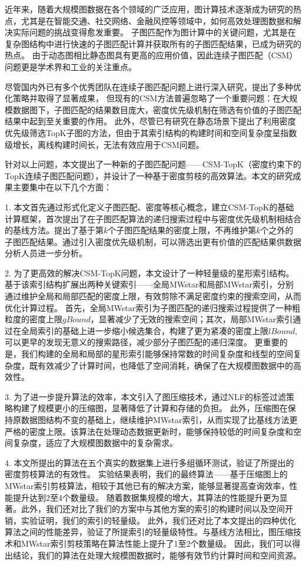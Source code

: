 \begin{summary}
	近年来，随着大规模图数据在各个领域的广泛应用，图计算技术逐渐成为研究的热点，尤其是在智能交通、社交网络、金融风控等领域中，如何高效处理图数据和解决实际问题的挑战变得愈发重要。
	子图匹配作为图计算中的关键问题，尤其是在复杂图结构中进行快速的子图匹配计算并获取所有的子图匹配结果，已成为研究的热点。
	由于动态图相比静态图具有更高的应用价值，因此连续子图匹配（CSM）问题更是学术界和工业的关注重点。

	尽管国内外已有多个优秀团队在连续子图匹配问题上进行深入研究，提出了多种优化策略并取得了显著成果，
	但现有的CSM方法普遍忽略了一个重要问题：在大规模数据图下，子图匹配的结果数目庞大，密度优先级机制在筛选有价值的子图匹配结果中起到至关重要的作用。
	此外，尽管已有研究在静态场景下提出了利用密度优先级筛选TopK子图的方法，但由于其索引结构的构建时间和空间复杂度呈指数级增长，离线构建时间长，无法有效应用于CSM问题。
	
	针对以上问题，本文提出了一种新的子图匹配问题——CSM-TopK（密度约束下的TopK连续子图匹配问题），并设计了一种基于密度剪枝的高效算法。本文的研究成果主要集中在以下几个方面：
		
		1. 本文首先通过形式化定义子图匹配、密度等核心概念，建立CSM-TopK的基础计算框架，首次提出了在子图匹配算法的递归搜索过程中与密度优先级机制相结合的基线方法。提出了基于第$k$个子图匹配结果的密度上限，不再维护第$k$个之外的子图匹配结果。通过引入密度优先级机制，可以筛选出更有价值的匹配结果供数据分析人员进一步分析。

		2.	为了更高效的解决CSM-TopK问题，本文设计了一种轻量级的星形索引结构。基于该索引结构扩展出两种关键索引——全局MWstar和局部MWstar索引，分别通过维护全局和局部匹配的密度上限，有效剪除不满足密度约束的搜索空间，从而优化计算过程。
		首先，全局MWstar索引为子图匹配的递归搜索过程提供了一种粗粒度的密度上限$gBound$，显著减少了无效的搜索空间；其次，局部MWstar索引通过在全局索引的基础上进一步缩小候选集合，构建了更为紧凑的密度上限$lBound$,可以更早的发现无意义的搜索路径，减少部分子图匹配的递归深度。
		更重要的是，我们构建的全局和局部的星形索引能够保持常数的时间复杂度和线型的空间复杂度，既有效减少了计算时间，也降低了空间消耗，确保了在大规模图数据中的高效性。

		3. 为了进一步提升算法的效率，本文引入了图压缩技术，通过NLF的标签过滤策略构建了规模更小的压缩图，显著降低了计算和存储的负担。
		此外，压缩图在保持原数据图结构不变的基础上，继续维护MWstar索引，从而实现了比基线方法更严格的密度上限。该算法在处理动态数据更新时，能够保持较低的时间复杂度和空间复杂度，适应了大规模图数据中的复杂需求。
		
		4.	本文所提出的算法在五个真实的数据集上进行多组循环测试，验证了所提出的密度剪枝算法的有效性。
		实验结果表明，我们的最终算法——基于压缩图上的MWstar索引剪枝算法，相较于其他已有的解决方案，能够显著提高查询效率，性能提升达到2至4个数量级。
		随着数据集规模的增大，其算法的性能提升更为显著。此外，我们还对比了我们的方案中与其他方案的索引的构建时间以及空间开销，实验证明，我们的索引的轻量级。
		此外，我们还对比了本文提出的四种优化算法之间的性能差异，验证了所提索引的轻量级特性。与基线方法相比，图压缩技术和MWstar索引剪枝策略在算法性能上提升了1至2个数量级。
		因此，我们可以得出结论，我们的算法在处理大规模图数据时，能够有效节约计算时间和空间资源。
	

\end{summary}
